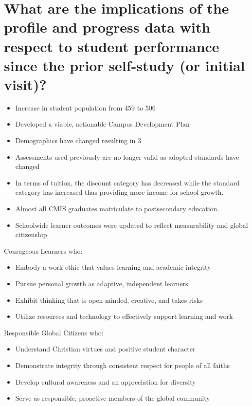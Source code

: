 \section{What are the implications of the profile and progress data with respect to student performance since the prior self-study (or initial visit)?}

\begin{itemize}
\item Increase in student population from 459 to 506
\item Developed a viable, actionable Campus Development Plan
\item Demographics have changed resulting in 3%
\item Assessments used previously are no longer valid as adopted standards have changed
\item In terms of tuition, the discount category has decreased while the standard category has increased thus providing more income for school growth.
\item Almost all CMIS graduates matriculate to postsecondary education. 
\item Schoolwide learner outcomes were updated to reflect measurability and global citizenship
\end{itemize}

Courageous Learners who: 
\begin{itemize}
\item Embody a work ethic that values learning and academic integrity
\item Pursue personal growth as adaptive, independent learners
\item Exhibit thinking that is open minded, creative, and takes risks
\item Utilize resources and technology to effectively support learning and work
\end{itemize}

Responsible Global Citizens who:
\begin{itemize}
\item Understand Christian virtues and positive student character 
\item Demonstrate integrity through consistent respect for people of all faiths
\item Develop cultural awareness and an appreciation for diversity
\item Serve as responsible, proactive members of the global community
\end{itemize}


